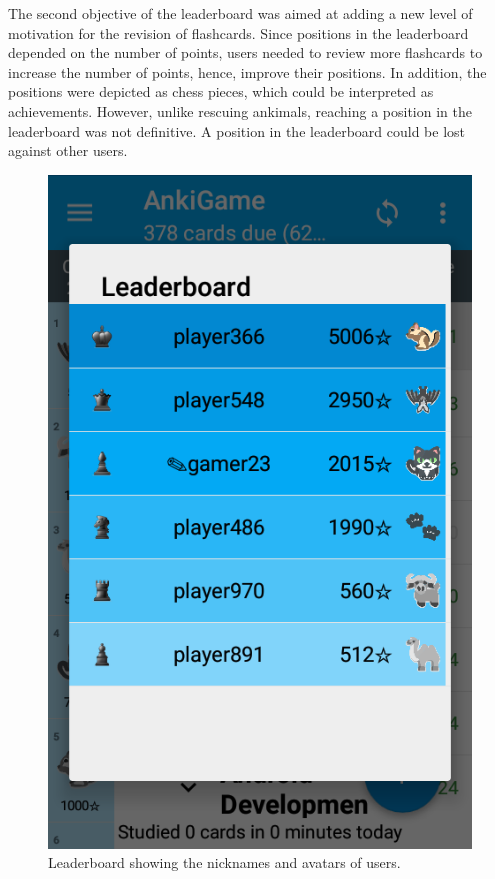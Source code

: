 The second objective of the leaderboard was aimed at adding a new level of motivation for the revision of flashcards. Since positions in the leaderboard depended on the number of points, users needed to review more flashcards to increase the number of points, hence, improve their positions. In addition, the positions were depicted as chess pieces, which could be interpreted as achievements. However, unlike rescuing ankimals, reaching a position in the leaderboard was not definitive. A position in the leaderboard could be lost against other users.

\begin{figure}[htb]
    \vskip 5mm
        \begin{center}
            \includegraphics[scale=0.4]{./Figures/leaderboard.png}
            \caption{Leaderboard showing the nicknames and avatars of users.}
            \label{fig:leaderboard}
        \end{center}
    \vskip -5mm
\end{figure}

